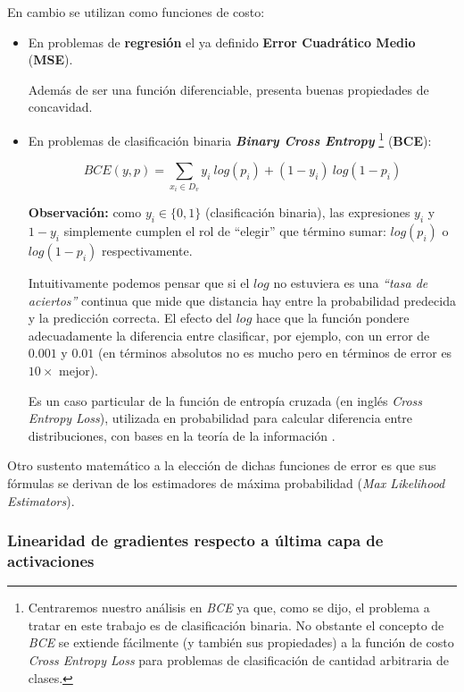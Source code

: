 En cambio se utilizan como funciones de costo:
\begin{itemize}
    \item En problemas de \textbf{regresión} el ya definido \textbf{Error Cuadrático Medio} (\textbf{MSE}).
    
    Además de ser una función diferenciable, presenta buenas propiedades de concavidad.

    \item En problemas de clasificación binaria \textbf{\textit{Binary Cross Entropy}} \footnote{Centraremos nuestro análisis en \textit{BCE} ya que, como se dijo, el problema a tratar en este trabajo es de clasificación binaria. No obstante el concepto de \textit{BCE} se extiende fácilmente (y también sus propiedades) a la función de costo \textit{Cross Entropy Loss} para problemas de clasificación de cantidad arbitraria de clases.} (\textbf{BCE}):
    
    \begin{equation*}
        BCE(y, p) = \sum_{x_i \in D_v} y_i~log(p_i) + (1-y_i)~log(1-p_i)
    \end{equation*}
    
    \textbf{Observación:} como $y_i \in \{0,1\}$ (clasificación binaria), las expresiones $y_i$ y $1-y_i$ simplemente cumplen el rol de ``elegir'' que término sumar: $log(p_i)$ o $log(1-p_i)$ respectivamente.
    
    Intuitivamente podemos pensar que si el $log$ no estuviera es una \textit{``tasa de aciertos''} continua que mide que distancia hay entre la probabilidad predecida y la predicción correcta. El efecto del $log$ hace que la función pondere adecuadamente la diferencia entre clasificar, por ejemplo, con un error de $0.001$ y $0.01$ (en términos absolutos no es mucho pero en términos de error es $10 \times$ mejor).
    
    Es un caso particular de la función de entropía cruzada (en inglés \textit{Cross Entropy Loss}), utilizada en probabilidad para calcular diferencia entre distribuciones, con bases en la teoría de la información \cite{math-ml}.
    
\end{itemize}

Otro sustento matemático a la elección de dichas funciones de error es que sus fórmulas se derivan de los estimadores de máxima probabilidad (\textit{Max Likelihood Estimators}). 

\subsubsection{Linearidad de gradientes respecto a última capa de activaciones}

